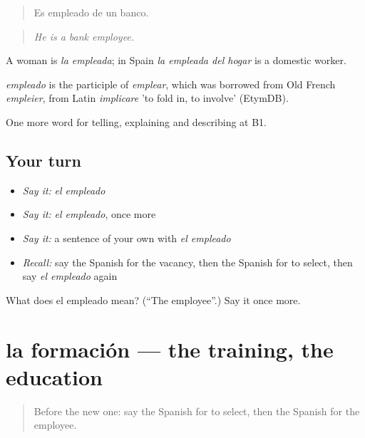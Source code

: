 \begin{quote}
Es empleado de un banco.
\end{quote}

\begin{quote}
\emph{He is a bank employee.}
\end{quote}

A woman is \emph{la empleada}; in Spain \emph{la empleada del hogar} is a domestic worker.

\begin{cousinweb}
\emph{empleado} is the participle of \emph{emplear}, which was borrowed from Old French \emph{empleier}, from Latin \emph{implicare} 'to fold in, to involve' (EtymDB).
\end{cousinweb}

\begin{grammarlens}[title={What you've built}]
One more word for telling, explaining and describing at B1.
\end{grammarlens}

\subsection*{Your turn}
\begin{itemize}
\raggedright
  \item \emph{Say it:} \emph{el empleado}
  \item \emph{Say it:} \emph{el empleado}, once more
  \item \emph{Say it:} a sentence of your own with \emph{el empleado}
  \item \emph{Recall:} say the Spanish for the vacancy, then the Spanish for to select, then say \emph{el empleado} again
\end{itemize}

\begin{tcolorbox}[breakable,colback=teal!4,colframe=teal!35!black,title={Before you move on}]
What does el empleado mean? (\textquotedblleft{}The employee\textquotedblright{}.) Say it once more.
\end{tcolorbox}
\section[la formación]{la formación — the training, the education}

\label{lesson:ES-C590-formacion}



\begin{quote}
Before the new one: say the Spanish for to select, then the Spanish for the employee.
\end{quote}


